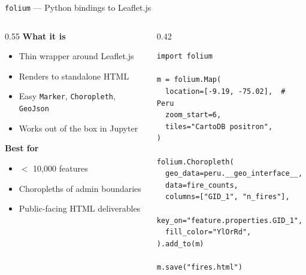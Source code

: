 \documentclass[10pt,aspectratio=169]{beamer}
\begin{document}
\begin{frame}[fragile]{\texttt{folium} — Python bindings to Leaflet.js}
  \begin{columns}[T]
    \begin{column}{0.55\textwidth}
      \textbf{What it is}
      \begin{itemize}\itemsep2pt
        \item Thin wrapper around Leaflet.js
        \item Renders to standalone HTML
        \item Easy \texttt{Marker}, \texttt{Choropleth}, \texttt{GeoJson}
        \item Works out of the box in Jupyter
      \end{itemize}
      \vspace{0.4em}
      \textbf{Best for}
      \begin{itemize}\itemsep2pt
        \item $<$ 10{,}000 features
        \item Choropleths of admin boundaries
        \item Public-facing HTML deliverables
      \end{itemize}
    \end{column}
    \begin{column}{0.42\textwidth}
\begin{lstlisting}[style=py]
import folium

m = folium.Map(
  location=[-9.19, -75.02],  # Peru
  zoom_start=6,
  tiles="CartoDB positron",
)

folium.Choropleth(
  geo_data=peru.__geo_interface__,
  data=fire_counts,
  columns=["GID_1", "n_fires"],
  key_on="feature.properties.GID_1",
  fill_color="YlOrRd",
).add_to(m)

m.save("fires.html")
\end{lstlisting}
    \end{column}
  \end{columns}
\end{frame}
\end{document}

